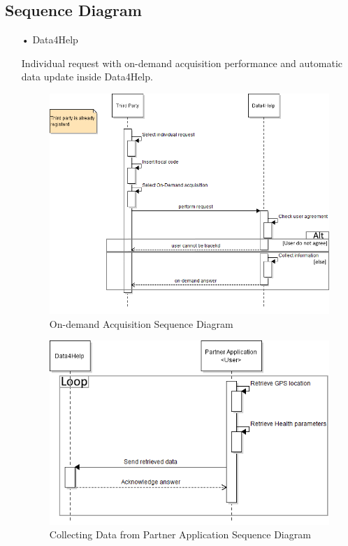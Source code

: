 \subsection{Sequence Diagram}
\begin{enumerate}
\item[•]{\Large Data4Help}


Individual request with on-demand acquisition performance and automatic data update inside Data4Help.
\begin{figure}[H]
\centering
\includegraphics[scale=0.75]{Images/Seq_Data4Help_onDem.png}
\caption{On-demand Acquisition Sequence Diagram}
\end{figure}

\begin{figure}[H]
\centering
\includegraphics[scale=0.75]{Images/Seq_Data4Help_autoUp.png}
\caption{Collecting Data from Partner Application Sequence Diagram}
\end{figure}


\end{enumerate}
